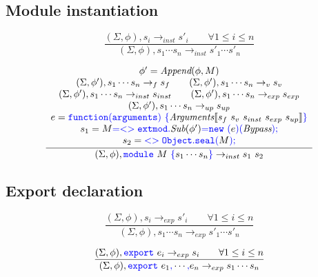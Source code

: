 \documentclass[a4paper]{article}
\newcommand{\code}[1]{\textcolor{blue}{\tt #1}}
\begin{document}
\subsection{Module instantiation}
\begin{equation*}
\frac{
    (\Sigma, \phi), s_i \rightarrow_{inst} s'_i \qquad \forall 1 \le i \le n
}{
    (\Sigma, \phi), s_1 \cdots s_n \rightarrow_{inst} s'_1 \cdots s'_n
}
\end{equation*}

\begin{equation*}
\frac{
    \begin{array}{c}
    \phi' = \emph{Append} (\phi, M) \\
    (\Sigma, \phi'), s_1 \cdots s_n \rightarrow_f s_f \qquad
    (\Sigma, \phi'), s_1 \cdots s_n \rightarrow_v s_v \\
    (\Sigma, \phi'), s_1 \cdots s_n \rightarrow_{inst} s_{inst} \qquad
    (\Sigma, \phi'), s_1 \cdots s_n \rightarrow_{exp} s_{exp} \\
    (\Sigma, \phi'), s_1 \cdots s_n \rightarrow_{up} s_{up} \\
    e = \code{function(arguments)}\ \code{\{} \emph{Arguments} \llbracket s_f\ s_v\ s_{inst}\ s_{exp}\ s_{up} \rrbracket \code{\}} \\
    s_1 = M \code{=} \code{<>extmod.} \emph{Sub} (\phi') \code{=} \code{new}\ \code{(} e \code{)} \code{(} \emph{Bypass} \code{);} \\
    s_2 = \code{<>Object.seal(} M \code{);} \\
    \end{array}
}{
    (\Sigma, \phi), \code{module}\ M\ \code{\{} s_1 \cdots s_n \code{\}} \rightarrow_{inst} s_1\ s_2
}
\end{equation*}

\subsection{Export declaration}
\begin{equation*}
\frac{
    (\Sigma, \phi), s_i \rightarrow_{exp} s'_i \qquad \forall 1 \le i \le n
}{
    (\Sigma, \phi), s_1 \cdots s_n \rightarrow_{exp} s'_1 \cdots s'_n
}
\end{equation*}

\begin{equation*}
\frac{
    (\Sigma, \phi), \code{export}\ e_i \rightarrow_{exp} s_i \qquad \forall 1 \le i \le n
}{
    (\Sigma, \phi), \code{export}\ e_1 \code{,} \cdots \code{,} e_n \rightarrow_{exp} s_1 \cdots s_n
}
\end{equation*}
\end{document}
